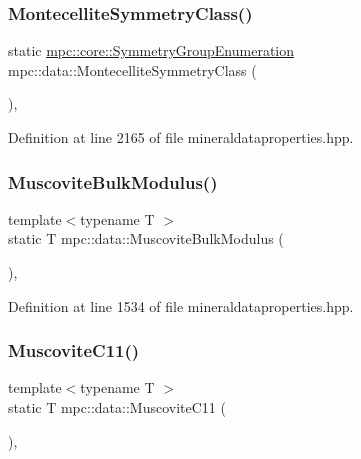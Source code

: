 \subsubsection{\texorpdfstring{Montecellite\+Symmetry\+Class()}{MontecelliteSymmetryClass()}}
{\footnotesize\ttfamily static \mbox{\hyperlink{namespacempc_1_1core_a9d979684062547055a0ef5c13077bad8}{mpc\+::core\+::\+Symmetry\+Group\+Enumeration}} mpc\+::data\+::\+Montecellite\+Symmetry\+Class (\begin{DoxyParamCaption}{ }\end{DoxyParamCaption})\hspace{0.3cm}{\ttfamily [inline]}, {\ttfamily [static]}}



Definition at line 2165 of file mineraldataproperties.\+hpp.

\mbox{\label{namespacempc_1_1data_a769f00b3db436fe21da547e0c0e89eae}} 
\subsubsection{\texorpdfstring{Muscovite\+Bulk\+Modulus()}{MuscoviteBulkModulus()}}
{\footnotesize\ttfamily template$<$typename T $>$ \\
static T mpc\+::data\+::\+Muscovite\+Bulk\+Modulus (\begin{DoxyParamCaption}{ }\end{DoxyParamCaption})\hspace{0.3cm}{\ttfamily [inline]}, {\ttfamily [static]}}



Definition at line 1534 of file mineraldataproperties.\+hpp.

\mbox{\label{namespacempc_1_1data_a203d3b7c4b3a16dd0875f4529cd37eb6}} 
\subsubsection{\texorpdfstring{Muscovite\+C11()}{MuscoviteC11()}}
{\footnotesize\ttfamily template$<$typename T $>$ \\
static T mpc\+::data\+::\+Muscovite\+C11 (\begin{DoxyParamCaption}{ }\end{DoxyParamCaption})\hspace{0.3cm}{\ttfamily [inline]}, {\ttfamily [static]}}



